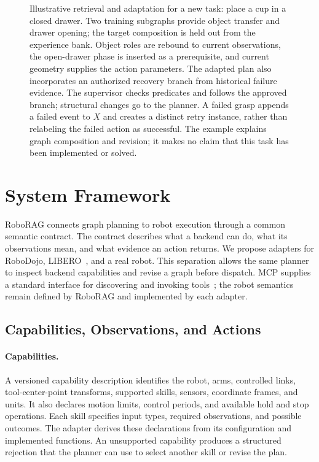 \documentclass[10pt,twocolumn,letterpaper]{article}
\begin{document}
\begin{figure}[t]
{{\begin{tikzpicture}[x=1pt,y=1pt,>=stealth]
\end{tikzpicture}}
}
\caption{Illustrative retrieval and adaptation for a new task: place a cup in a closed drawer. Two training subgraphs provide object transfer and drawer opening; the target composition is held out from the experience bank. Object roles are rebound to current observations, the open-drawer phase is inserted as a prerequisite, and current geometry supplies the action parameters. The adapted plan also incorporates an authorized recovery branch from historical failure evidence. The supervisor checks predicates and follows the approved branch; structural changes go to the planner. A failed grasp appends a failed event to $X$ and creates a distinct retry instance, rather than relabeling the failed action as successful. The example explains graph composition and revision; it makes no claim that this task has been implemented or solved.}
\label{fig:adaptation}
\end{figure}


\section{System Framework}
\label{sec:system}

RoboRAG connects graph planning to robot execution through a common semantic contract. The contract describes what a backend can do, what its observations mean, and what evidence an action returns. We propose adapters for RoboDojo, LIBERO~\cite{libero2023}, and a real robot. This separation allows the same planner to inspect backend capabilities and revise a graph before dispatch. MCP supplies a standard interface for discovering and invoking tools~\cite{mcp2026}; the robot semantics remain defined by RoboRAG and implemented by each adapter.

\subsection{Capabilities, Observations, and Actions}

\paragraph{Capabilities.}
A versioned capability description identifies the robot, arms, controlled links, tool-center-point transforms, supported skills, sensors, coordinate frames, and units. It also declares motion limits, control periods, and available hold and stop operations. Each skill specifies input types, required observations, and possible outcomes. The adapter derives these declarations from its configuration and implemented functions. An unsupported capability produces a structured rejection that the planner can use to select another skill or revise the plan.
\end{document}
